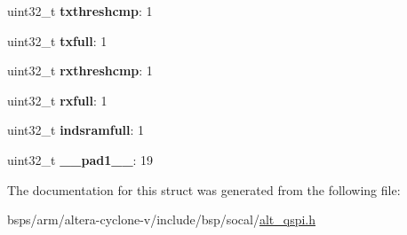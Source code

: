 \begin{DoxyCompactItemize}
\mbox{\label{structALT__QSPI__IRQMSK__s_ac8e5442d9beac84300f52f1ddc02e264}} 
uint32\+\_\+t {\bfseries txthreshcmp}\+: 1
\item 
\mbox{\label{structALT__QSPI__IRQMSK__s_af8e38bb42b951b5eada20396fd82abc2}} 
uint32\+\_\+t {\bfseries txfull}\+: 1
\item 
\mbox{\label{structALT__QSPI__IRQMSK__s_a0d9aba18460b3ff6366509434f2ab90b}} 
uint32\+\_\+t {\bfseries rxthreshcmp}\+: 1
\item 
\mbox{\label{structALT__QSPI__IRQMSK__s_a2d600bbab863e691f91d219e004ac893}} 
uint32\+\_\+t {\bfseries rxfull}\+: 1
\item 
\mbox{\label{structALT__QSPI__IRQMSK__s_a499941706ee20ab01e59c92a283941f7}} 
uint32\+\_\+t {\bfseries indsramfull}\+: 1
\item 
\mbox{\label{structALT__QSPI__IRQMSK__s_a4a3d3bdeb542256efff64c87a116059b}} 
uint32\+\_\+t {\bfseries \+\_\+\+\_\+pad1\+\_\+\+\_\+}\+: 19
\end{DoxyCompactItemize}


The documentation for this struct was generated from the following file\+:\begin{DoxyCompactItemize}
\item 
bsps/arm/altera-\/cyclone-\/v/include/bsp/socal/\mbox{\hyperlink{include_2bsp_2socal_2alt__qspi_8h}{alt\+\_\+qspi.\+h}}\end{DoxyCompactItemize}
